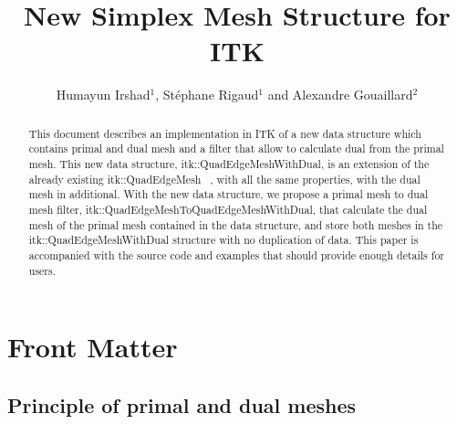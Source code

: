 \documentclass{InsightArticle}
\title{New Simplex Mesh Structure for ITK}
\author{Humayun Irshad$^{1}$, St\'{e}phane Rigaud$^{1}$ and Alexandre Gouaillard$^{2}$}
\newcommand{\IJhandlerIDnumber}{1338} %
\begin{document}
%
% 
\IJhandlefooter{\IJhandlerIDnumber}


\ifpdf
\else
\fi


\maketitle


\ifhtml
\chapter*{Front Matter\label{front}}
\fi


\begin{abstract}
\noindent
This document describes an implementation in ITK of a new data structure which contains primal and dual mesh and a filter that allow to calculate dual from the primal mesh. %
This new data structure, itk::QuadEdgeMeshWithDual, is an extension of the already existing itk::QuadEdgeMesh ~\cite{Gouaillard2006}, with all the same properties, with the dual mesh in additional.
With the new data structure, we propose a primal mesh to dual mesh filter, itk::QuadEdgeMeshToQuadEdgeMeshWithDual, that calculate the dual mesh of the primal mesh contained in the data structure, and store both meshes in the itk::QuadEdgeMeshWithDual structure with no duplication of data.
This paper is accompanied with the source code and examples that should provide enough details for users.

\end{abstract}

\IJhandlenote{\IJhandlerIDnumber}

\tableofcontents

\section{Principle of primal and dual meshes}
\end{document}
